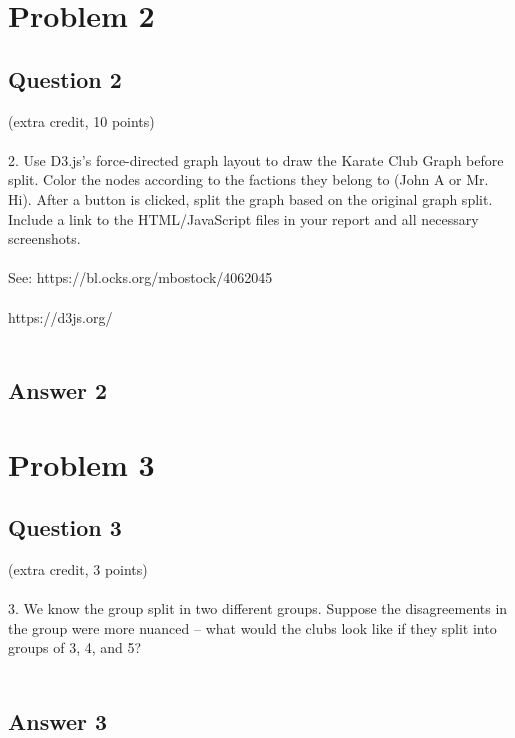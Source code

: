 \documentclass[10pt,letterpaper]{article}
\begin{document}
\pagebreak 
\section{Problem 2}
\subsection{Question 2}
(extra credit, 10 points)\\
\\
2. Use D3.js's force-directed graph layout to draw the Karate Club Graph before split. Color the nodes according to the factions they belong to (John A or Mr. Hi). After a button is clicked, split the graph based on the original graph split. Include a link to the HTML/JavaScript files in your report and all necessary screenshots.\\
\\
See: https://bl.ocks.org/mbostock/4062045\\
\\
https://d3js.org/\\
\\
\subsection{Answer 2}

\pagebreak
\section{Problem 3}
\subsection{Question 3}
(extra credit, 3 points)\\
\\
3.  We know the group split in two different groups.  Suppose the
disagreements in the group were more nuanced -- what would the clubs
look like if they split into groups of 3, 4, and 5?\\
\\
\subsection{Answer 3}
\end{document}
